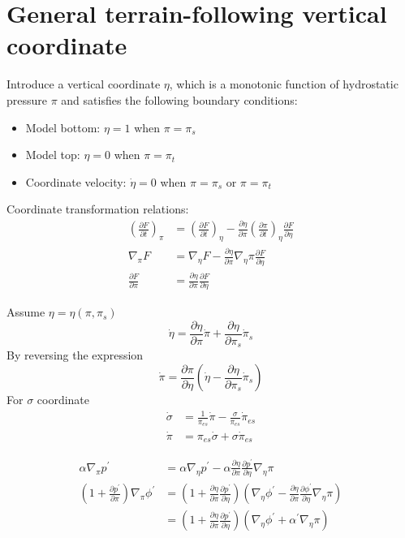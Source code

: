 \documentclass[12pt]{article}
\numberwithin{equation}{section}
\newcommand{\pd}[2]{\frac{\partial #1}{\partial #2}}
\newcommand{\pdt}[1]{\pd{#1}{t}}
\newcommand{\grad}[2][\pi]{\nabla_{#1} #2}
\begin{document}
\section{General terrain-following vertical coordinate}

Introduce a vertical coordinate $\eta$, which is a monotonic function of hydrostatic pressure $\pi$ and satisfies the following boundary conditions:
\begin{itemize}
  \item Model bottom: $\eta = 1$ when $\pi = \pi_s$
  \item Model top: $\eta = 0$ when $\pi = \pi_t$
  \item Coordinate velocity: $\dot{\eta} = 0$ when $\pi = \pi_s$ or $\pi = \pi_t$
\end{itemize}
Coordinate transformation relations:
\begin{align*}
  \left(\pdt{F}\right)_\pi & = \left(\pdt{F}\right)_\eta - \pd{\eta}{\pi} \left(\pdt{\pi}\right)_\eta \pd{F}{\eta} \\
  \grad{F} & = \grad[\eta]{F} - \pd{\eta}{\pi} \grad[\eta]{\pi} \pd{F}{\eta} \\
  \pd{F}{\pi} & = \pd{\eta}{\pi} \pd{F}{\eta}
\end{align*}

Assume $\eta = \eta\left(\pi, \pi_{s}\right)$
\begin{equation*}
  \dot{\eta} = \pd{\eta}{\pi} \dot{\pi} + \pd{\eta}{\pi_s} \dot{\pi}_s
\end{equation*}
By reversing the expression
\begin{equation*}
  \dot{\pi} = \pd{\pi}{\eta} \left(\dot{\eta} - \pd{\eta}{\pi_s} \dot{\pi}_s\right)
\end{equation*}
For $\sigma$ coordinate
\begin{align*}
  \dot{\sigma} & = \frac{1}{\pi_{es}} \dot{\pi} - \frac{\sigma}{\pi_{es}} \dot{\pi}_{es} \\
  \dot{\pi} & = \pi_{es} \dot{\sigma} + \sigma \dot{\pi}_{es}
\end{align*}

\begin{align*}
  \alpha \grad[\pi]{p^\prime} & = \alpha \grad[\eta]{p^\prime} - \alpha \pd{\eta}{\pi} \pd{p^\prime}{\eta} \grad[\eta]{\pi} \\
  \left(1 + \pd{p^\prime}{\pi}\right) \grad[\pi]{\phi^\prime} & = \left(1 + \pd{\eta}{\pi} \pd{p^\prime}{\eta}\right) \left(\grad[\eta]{\phi^\prime} - \pd{\eta}{\pi} \pd{\phi^\prime}{\eta} \grad[\eta]{\pi}\right) \\
  & = \left(1 + \pd{\eta}{\pi} \pd{p^\prime}{\eta}\right) \left(\grad[\eta]{\phi^\prime} + \alpha^\prime \grad[\eta]{\pi}\right)
\end{align*}
\end{document}
